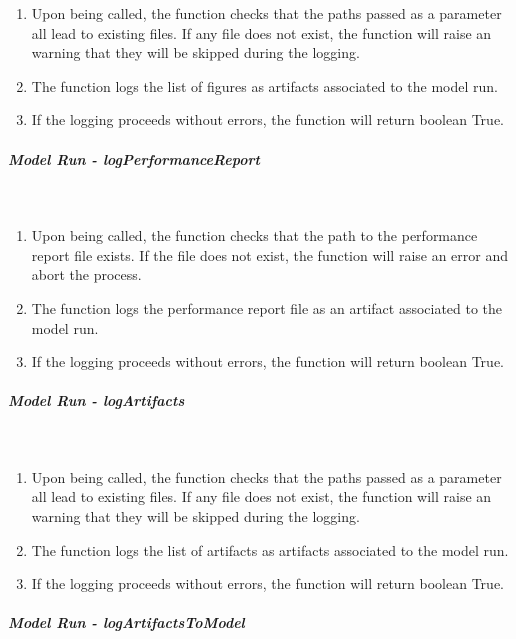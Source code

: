 \begin{enumerate}
    \item Upon being called, the function checks that the paths passed as a parameter all lead to existing files. If any file does not exist, the function will raise an warning that they will be skipped during the logging.
    \item The function logs the list of figures as artifacts associated to the model run.
    \item If the logging proceeds without errors, the function will return boolean True.
\end{enumerate}

\subparagraph{Model Run - logPerformanceReport} \mbox{}\\

\begin{enumerate}
    \item Upon being called, the function checks that the path to the performance report file exists. If the file does not exist, the function will raise an error and abort the process.
    \item The function logs the performance report file as an artifact associated to the model run.
    \item If the logging proceeds without errors, the function will return boolean True.
\end{enumerate}

\subparagraph{Model Run - logArtifacts} \mbox{}\\

\begin{enumerate}
    \item Upon being called, the function checks that the paths passed as a parameter all lead to existing files. If any file does not exist, the function will raise an warning that they will be skipped during the logging.
    \item The function logs the list of artifacts as artifacts associated to the model run.
    \item If the logging proceeds without errors, the function will return boolean True.
\end{enumerate}

\subparagraph{Model Run - logArtifactsToModel} \mbox{}\\

